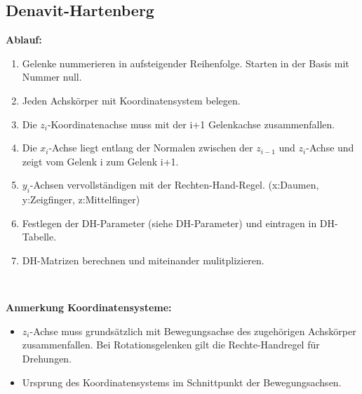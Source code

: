 \subsection{Denavit-Hartenberg}
\begin{minipage}{19cm}
	\textbf{Ablauf:}
	\begin{enumerate}{\setlength{\itemsep}{0cm}\setlength{\parsep}{0cm} \setlength{\topsep}{0cm}}
      \item Gelenke nummerieren in aufsteigender Reihenfolge. Starten in der Basis mit Nummer null.
      \item Jeden Achskörper mit Koordinatensystem belegen.
      \item Die $z_i$-Koordinatenachse muss mit der i+1 Gelenkachse zusammenfallen.
      \item Die $x_i$-Achse liegt entlang der Normalen zwischen der $z_{i-1}$ und $z_i$-Achse und zeigt vom Gelenk i zum Gelenk i+1.
      \item $y_i$-Achsen vervollständigen mit der Rechten-Hand-Regel. (x:Daumen, y:Zeigfinger, z:Mittelfinger)
      \item Festlegen der DH-Parameter (siehe DH-Parameter) und eintragen in DH-Tabelle.
      \item DH-Matrizen berechnen und miteinander mulitplizieren.
    \end{enumerate}
    \vspace{0.2cm}
\end{minipage}\\

\begin{minipage}{19cm}
	\textbf{Anmerkung Koordinatensysteme:}
	\begin{itemize}\itemsep0pt
      \item $z_i$-Achse muss grundsätzlich mit Bewegungsachse des zugehörigen Achskörper zusammenfallen.
      		Bei Rotationsgelenken gilt die Rechte-Handregel für Drehungen. 
      \item Ursprung des Koordinatensystems im Schnittpunkt der Bewegungsachsen.
    \end{itemize}
    \vspace{0.2cm}
\end{minipage}\\

